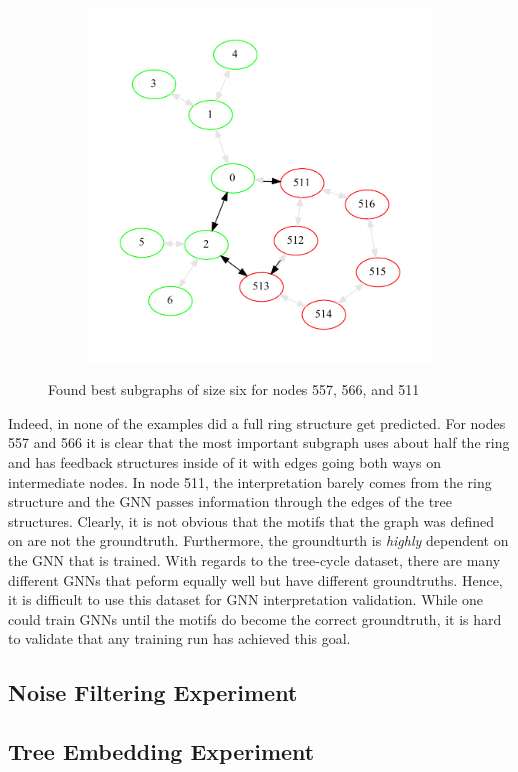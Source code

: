 \begin{figure}[H]
\begin{subfigure}{0.49\textwidth}
		\includegraphics[width=0.95\linewidth]{images/tree-cycles-511.pdf}
	\end{subfigure}
	\caption{Found best subgraphs of size six for nodes 557, 566, and 511}
	\label{fig:tree-cycles-gt}
\end{figure}

Indeed, in none of the examples did a full ring structure get predicted. For nodes 557 and 566 it is clear that the most important subgraph uses about half the ring and has feedback structures inside of it with edges going both ways on intermediate nodes. In node 511, the interpretation barely comes from the ring structure and the GNN passes information through the edges of the tree structures. Clearly, it is not obvious that the motifs that the graph was defined on are not the groundtruth. Furthermore, the groundturth is \textit{highly} dependent on the GNN that is trained. With regards to the tree-cycle dataset, there are many different GNNs that peform equally well but have different groundtruths. Hence, it is difficult to use this dataset for GNN interpretation validation. While one could train GNNs until the motifs do become the correct groundtruth, it is hard to validate that any training run has achieved this goal.



\subsection{Noise Filtering Experiment}

\subsection{Tree Embedding Experiment}

\newpage

